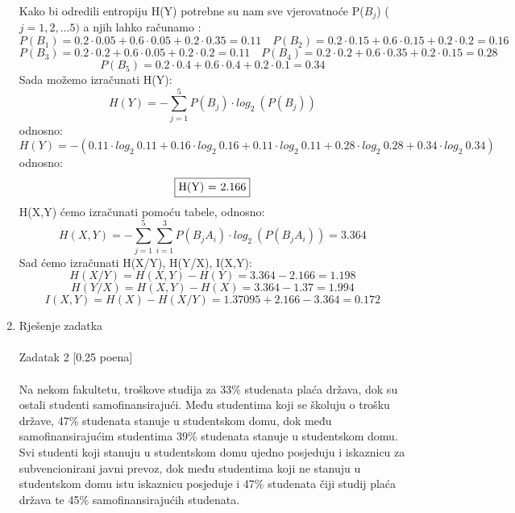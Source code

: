 \documentclass[12pt]{article}
\begin{document}
\begin{enumerate}
 Kako bi odredili entropiju H(Y) potrebne su nam sve vjerovatnoće P($B_j$) ($j = 1,2,...5)$ a njih lahko računamo : \\
\begin{equation*}
    P(B_1) = 0.2\cdot0.05 + 0.6\cdot0.05 + 0.2\cdot0.35 = 0.11 
\quad P(B_2) = 0.2\cdot0.15 + 0.6\cdot0.15 + 0.2\cdot0.2 = 0.16
\end{equation*}
\begin{equation*}
    P(B_3) = 0.2\cdot0.2 + 0.6\cdot0.05 + 0.2\cdot0.2=0.11
    \quad P(B_4) = 0.2\cdot0.2 + 0.6\cdot0.35 + 0.2\cdot0.15=0.28
\end{equation*}
\begin{equation*}
    P(B_5) = 0.2\cdot0.4 + 0.6\cdot0.4 + 0.2\cdot0.1=0.34
\end{equation*}
\vspace{0.25cm}
Sada možemo izračunati H(Y):
\begin{equation*}
    H(Y) = - \sum_{j = 1}^5 P(B_j) \cdot log_2~(P(B_j))
\end{equation*}
odnosno:
\begin{equation*}
    H(Y) = - (0.11 \cdot log_2~0.11 + 0.16 \cdot log_2~0.16 + 0.11 \cdot log_2~0.11
    + 0.28 \cdot log_2~0.28 + 0.34 \cdot log_2~0.34)
\end{equation*}
odnosno:
\begin{equation*}
    \fbox{H(Y) = 2.166}
\end{equation*}
H(X,Y) ćemo izračunati pomoću tabele, odnosno:\\
\begin{equation*}
    H(X,Y) = - \sum_{j = 1}^5\sum_{i = 1}^3 P(B_jA_i) \cdot log_2~(P(B_jA_i)) = 3.364
\end{equation*}
Sad ćemo izračunati H(X/Y), H(Y/X), I(X,Y):
\begin{equation*}
    H(X/Y) = H(X,Y) - H(Y) = 3.364 - 2.166 = 1.198
\end{equation*}
\begin{equation*}
    H(Y/X) = H(X,Y) - H(X) = 3.364 - 1.37 = 1.994
\end{equation*}
\begin{equation*}
    I(X,Y) = H(X) - H(X/Y) = 1.37095 + 2.166 - 3.364 = 0.172
\end{equation*}
		\item Rješenje zadatka \\
		\\
		Zadatak 2 [0.25 poena] \\
        \\
Na nekom fakultetu, troškove studija za 33\% studenata plaća država, dok su ostali studenti samofinansirajući. Među studentima koji se školuju o trošku države, 47\% studenata stanuje u studentskom domu, dok među samofinansirajućim studentima 39\% studenata stanuje u studentskom domu. Svi studenti koji stanuju u studentskom domu ujedno posjeduju i iskaznicu za subvencionirani javni prevoz, dok među studentima koji ne stanuju u studentskom domu istu iskaznicu posjeduje i 47\% studenata čiji studij plaća država te 45\% samofinansirajućih studenata.

\end{enumerate}
\end{document}
